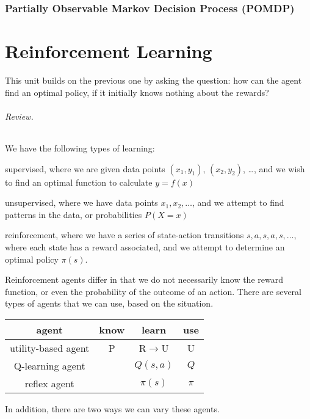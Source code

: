 \documentclass[10pt,a4paper]{article}
\newenvironment{itemize_packed}{
\begin{itemize}
\setlength{\itemsep}{0pt}
\setlength{\parskip}{0pt}
}{\end{itemize}}
\begin{document}
\section{Partially Observable Markov Decision Process (POMDP)}


\part{Reinforcement Learning}

This unit builds on the previous one by asking the question: how can the agent find an optimal policy, if it initially knows nothing about the rewards?

\paragraph{Review.} We have the following types of learning:
\begin{itemize_packed}
\item supervised, where we are given data points $(x_1, y_1)$, $(x_2,y_2)$, \ldots, and we wish to find an optimal function to calculate $y = f(x)$
\item unsupervised, where we have data points $x_1,x_2,\ldots$, and we attempt to find patterns in the data, or probabilities $P(X=x)$
\item reinforcement, where we have a series of state-action transitions $s,a,s,a,s,\ldots$, where each state has a reward associated, and we attempt to determine an optimal policy $\pi(s)$.
\end{itemize_packed}

Reinforcement agents differ in that we do not necessarily know the reward function, or even the probability of the outcome of an action. There are several types of agents that we can use, based on the situation.
\begin{center}
\begin{tabular}{c c c c}
agent & know & learn & use \\
\hline
utility-based agent & P & R$\rightarrow$U & U \\
Q-learning agent & & $Q(s,a)$ & $Q$ \\
reflex agent & & $\pi(s)$ & $\pi$
\end{tabular}
\end{center}
In addition, there are two ways we can vary these agents.
\end{document}
